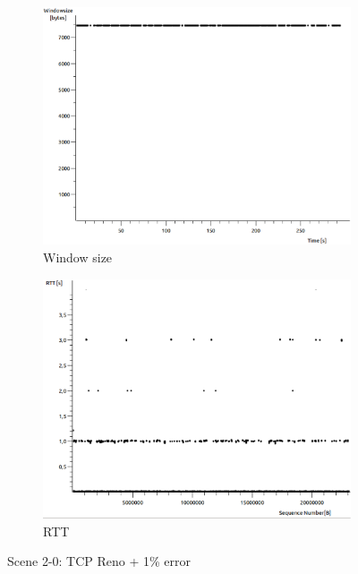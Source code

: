 \documentclass[conference,a4paper]{../../sty/IEEEtran}
\begin{document}
\begin{figure}
\begin{subfigure}[b]{0.2\textwidth}
  \includegraphics[width=\textwidth]{s2-0_wnd}
  \caption{Window size}
 \end{subfigure}
 \begin{subfigure}[b]{0.2\textwidth}
  \includegraphics[width=\textwidth]{s2-0_rtt}
  \caption{RTT}
 \end{subfigure}
 \caption{Scene 2-0: TCP Reno + 1\% error}
\end{figure}
\end{document}
